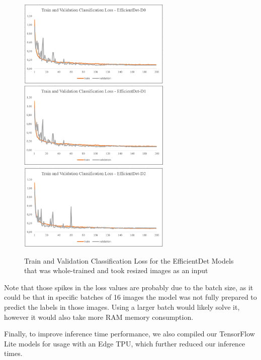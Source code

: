 \documentclass[openright]{normas-utf-tex} %
\begin{document}
\begin{figure}[H]
	\centering
	\includegraphics[width=0.65\textwidth]{./images/efficientdet-d0-resized-whole-loss.png}
	\includegraphics[width=0.65\textwidth]{./images/efficientdet-d1-resized-whole-loss.png}
	\includegraphics[width=0.65\textwidth]{./images/efficientdet-d2-resized-whole-loss.png}
	\caption[Train and Validation Classification Loss for the EfficientDet Models that 
		was whole-trained and took resized images as an input]{Train and Validation Classification Loss 
		for the EfficientDet Models that was whole-trained and took resized images as an input}
\end{figure}

Note that those spikes in the loss values are probably due to the batch size, as it could be 
that in specific batches of 16 images the model was not fully prepared to predict the labels
in those images. Using a larger batch would likely solve it, however it would also take more RAM
memory consumption. 

Finally, to improve inference time performance, we also compiled our TensorFlow Lite models for 
usage with an Edge TPU, which further reduced our inference times. 
\end{document}
